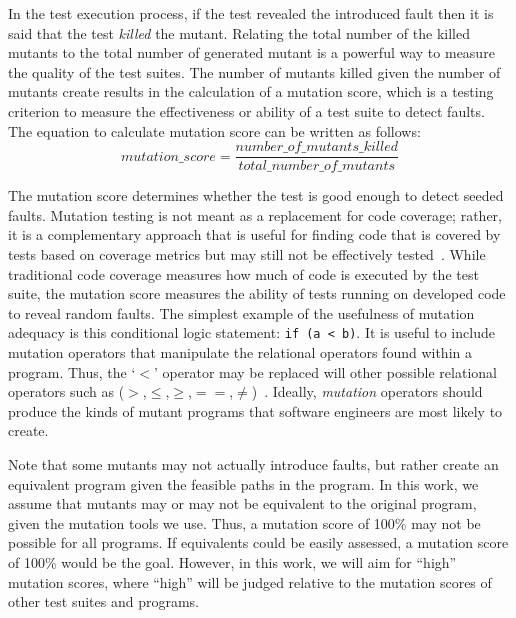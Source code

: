 \documentclass[conference]{IEEEtran}
\begin{document}
In the test execution process, if the test revealed the introduced fault then it is said that the test \textit{killed} the mutant. %
Relating the total number of the killed mutants to the total number of generated mutant is a powerful way to measure the quality of the test suites. The number of mutants killed given the number of mutants create results in the calculation of a mutation score, which is a testing criterion to measure the effectiveness or ability of a test suite to detect faults. The equation to calculate mutation score can be written as follows:
\begin{equation*}
mutation\_score = \frac{number\_of\_mutants\_killed }{total\_number\_of\_mutants} %
\end{equation*}

The mutation score determines whether the test is good enough to detect seeded faults. Mutation testing is not meant as a replacement for code coverage; rather, it is a complementary approach that is useful for finding code that is covered by tests based on coverage metrics but may still not be effectively tested~\cite{madeyski2010impact}. While traditional code coverage measures how much of code is executed by the test suite,  the mutation score measures the ability of tests running on developed code to reveal random faults. The simplest example of the usefulness of mutation adequacy is this conditional logic statement: \texttt{if (a < b)}. It is useful to include mutation operators that manipulate the relational operators found within a program.  Thus, the  `$<$' operator may be replaced will other possible relational operators such as ($>$,$\le$,$\ge$,$==$,$\ne$)~\cite{hamlet2000engineering}. Ideally, \textit{mutation} operators should produce the kinds of mutant programs that software engineers are most likely to create.

Note that some mutants may not actually introduce faults, but rather create an equivalent program given the feasible paths in the program.  In this work, we assume that mutants may or may not be equivalent to the original program, given the mutation tools we use.  Thus, a mutation score of 100\% may not be possible for all programs.  If equivalents could be easily assessed, a mutation score of 100\% would be the goal.  However, in this work, we will aim for ``high'' mutation scores, where ``high'' will be judged relative to the mutation scores of other test suites and programs. 
\end{document}
